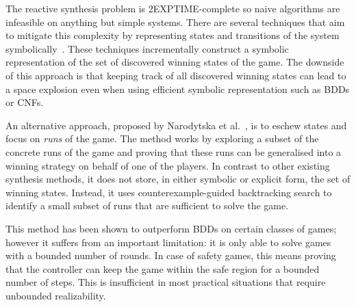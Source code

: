 \documentclass{llncs}
\begin{document}
The reactive synthesis problem is 2EXPTIME-complete so
naive algorithms are infeasible on anything but simple systems.
There are several techniques that aim to mitigate this complexity by
representing states and transitions of the system symbolically~\cite{Piterman_PS_06,bloem2014,morgenstern2013}. 
These techniques incrementally construct a symbolic representation of the set of 
discovered winning states of the game.  The downside of this approach is that 
keeping track of all discovered winning states can lead to a space explosion even
when using efficient symbolic representation such as BDDs or CNFs.



An alternative approach, proposed by Narodytska et al.~\cite{narodytska2014},
is to eschew states and focus on \emph{runs} of the game.  The method works by
exploring a subset of the concrete runs of the game and proving that these runs can be
generalised into a winning strategy on behalf of one of the players. In contrast to 
other existing synthesis methods, it does not store,
in either symbolic or explicit form, the set of winning states.
Instead, it uses counterexample-guided backtracking search to identify a small subset
of runs that are sufficient to solve the game.

This method has been shown to outperform BDDs on certain classes of games; however it
suffers from an important limitation: it is only able to solve games with a bounded number
of rounds.  In case of safety games, this means proving that the controller 
can keep the game within the safe region for a bounded number of steps.  
This is insufficient in most practical situations that require unbounded realizability.
\end{document}
